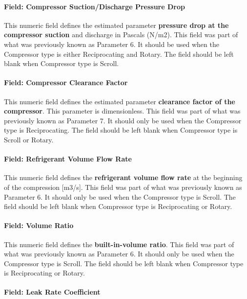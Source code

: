 \paragraph{Field: Compressor Suction/Discharge Pressure Drop}\label{field-compressor-suctiondischarge-pressure-drop-1}

This numeric field defines the estimated parameter \textbf{pressure drop at the compressor suction} and discharge in Pascals (N/m2). This field was part of what was previously known as Parameter 6. It should be used when the Compressor type is either Reciprocating and Rotary. The field should be left blank when Compressor type is Scroll.

\paragraph{Field: Compressor Clearance Factor}\label{field-compressor-clearance-factor-1}

This numeric field defines the estimated parameter \textbf{clearance factor of the compressor}. This parameter is dimensionless. This field was part of what was previously known as Parameter 7. It should only be used when the Compressor type is Reciprocating. The field should be left blank when Compressor type is Scroll or Rotary.

\paragraph{Field: Refrigerant Volume Flow Rate}\label{field-refrigerant-volume-flow-rate-1}

This numeric field defines the \textbf{refrigerant volume flow rate} at the beginning of the compression {[}m3/s{]}. This field was part of what was previously known as Parameter 6. It should only be used when the Compressor type is Scroll. The field should be left blank when Compressor type is Reciprocating or Rotary.

\paragraph{Field: Volume Ratio}\label{field-volume-ratio-1}

This numeric field defines the \textbf{built-in-volume ratio}. This field was part of what was previously known as Parameter 6. It should only be used when the Compressor type is Scroll. The field should be left blank when Compressor type is Reciprocating or Rotary.

\paragraph{Field: Leak Rate Coefficient}\label{field-leak-rate-coefficient-1}

